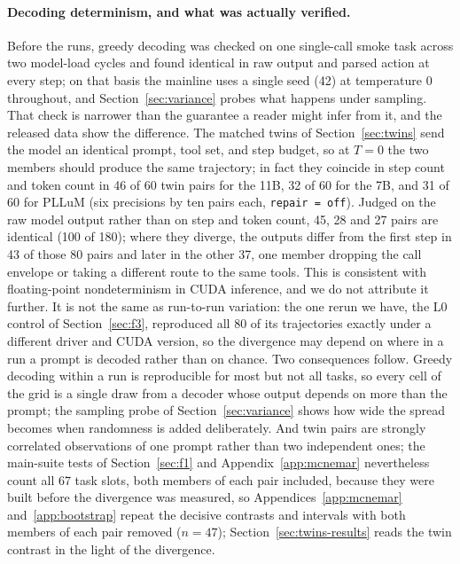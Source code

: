\documentclass[11pt]{article}
\begin{document}
\paragraph{Decoding determinism, and what was actually verified.} Before the runs, greedy decoding was checked on one single-call smoke task across two model-load cycles and found identical in raw output and parsed action at every step; on that basis the mainline uses a single seed (42) at temperature 0 throughout, and Section~\ref{sec:variance} probes what happens under sampling. That check is narrower than the guarantee a reader might infer from it, and the released data show the difference. The matched twins of Section~\ref{sec:twins} send the model an identical prompt, tool set, and step budget, so at $T=0$ the two members should produce the same trajectory; in fact they coincide in step count and token count in 46 of 60 twin pairs for the 11B, 32 of 60 for the 7B, and 31 of 60 for PLLuM (six precisions by ten pairs each, \texttt{repair\,=\,off}). Judged on the raw model output rather than on step and token count, 45, 28 and 27 pairs are identical (100 of 180); where they diverge, the outputs differ from the first step in 43 of those 80 pairs and later in the other 37, one member dropping the call envelope or taking a different route to the same tools. This is consistent with floating-point nondeterminism in CUDA inference, and we do not attribute it further. It is not the same as run-to-run variation: the one rerun we have, the L0 control of Section~\ref{sec:f3}, reproduced all 80 of its trajectories exactly under a different driver and CUDA version, so the divergence may depend on where in a run a prompt is decoded rather than on chance. Two consequences follow. Greedy decoding within a run is reproducible for most but not all tasks, so every cell of the grid is a single draw from a decoder whose output depends on more than the prompt; the sampling probe of Section~\ref{sec:variance} shows how wide the spread becomes when randomness is added deliberately. And twin pairs are strongly correlated observations of one prompt rather than two independent ones; the main-suite tests of Section~\ref{sec:f1} and Appendix~\ref{app:mcnemar} nevertheless count all 67 task slots, both members of each pair included, because they were built before the divergence was measured, so Appendices~\ref{app:mcnemar} and~\ref{app:bootstrap} repeat the decisive contrasts and intervals with both members of each pair removed ($n=47$); Section~\ref{sec:twins-results} reads the twin contrast in the light of the divergence.
\end{document}
